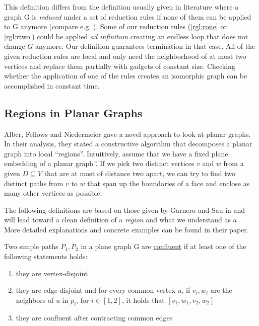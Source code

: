 This definition differs from the definition usually given in literature where a graph G is \textit{reduced} under a set of reduction rules if none of them can be applied to G anymore (compare e.g. \cite{Fomin2019}). Some of our reduction rules (\cref{rgl:rone} or \cref{rgl:rtwo}) could be applied \textit{ad infinitum} creating an endless loop that does not change $G$ anymore. Our definition guarantees termination in that case. All of the given reduction rules are local and only need the neighborhood of at most two vertices and replace them partially with gadgets of constant size. Checking whether the application of one of the rules creates an isomorphic graph can be accomplished in constant time.

\subsection{Regions in Planar Graphs}

Alber, Fellows and Niedermeier \cite{Alber2004} gave a novel approach to look at planar graphs. In their analysis, they stated a constructive algorithm that decomposes a planar graph into local ``regions''. Intuitively, assume that we have a fixed plane embedding of a planar graph \G. If we pick two distinct vertices $v$ and $w$ from a given \sdom $D \subseteq V$ that are at most of distance two apart, we can try to find two distinct paths from $v$ to $w$ that span up the boundaries of a face and enclose as many other vertices as possible. 

The following definitions are based on those given by Garnero and Sau in \cite[Revision 2014]{Garnero2018} and will lead toward a clean definition of a \textit{region} and what we understand as a \dreg. More detailed explanations and concrete examples can be found in their paper.

\begin{definition}
    Two simple paths $P_1, P_2$ in a plane graph G are \underline{confluent} if at least one of the following statements holds:
    
    \begin{enumerate}
        \item they are vertex-disjoint
        \item they are edge-disjoint and for every common vertex $u$, if $v_i, w_i$ are the neighbors of $u$ in $p_i$, for $i \in [1,2]$, it holds that $[v_1, w_1, v_2, w_2]$
        \item they are confluent after contracting common edges
    \end{enumerate}
\end{definition}

